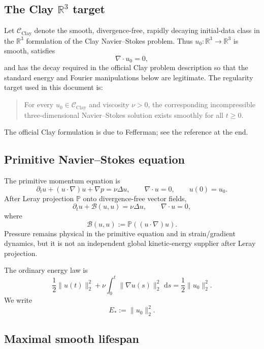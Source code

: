 \documentclass[11pt]{article}
\newcommand{\R}{\mathbb R}
\newcommand{\dd}{\,\mathrm d}
\begin{document}
\subsection{The Clay $\R^3$ target}

Let $\mathcal C_{\mathrm{Clay}}$ denote the smooth, divergence-free, rapidly decaying initial-data class in the $\R^3$ formulation of the Clay Navier--Stokes problem.  Thus $u_0:\R^3\to\R^3$ is smooth, satisfies
\[
\nabla\cdot u_0=0,
\]
and has the decay required in the official Clay problem description so that the standard energy and Fourier manipulations below are legitimate.  The regularity target used in this document is:

\begin{quote}
For every $u_0\in\mathcal C_{\mathrm{Clay}}$ and viscosity $\nu>0$, the corresponding incompressible three-dimensional Navier--Stokes solution exists smoothly for all $t\ge0$.
\end{quote}

The official Clay formulation is due to Fefferman; see the reference at the end.

\subsection{Primitive Navier--Stokes equation}

The primitive momentum equation is
\begin{equation}\label{eq:primitiveNS}
\partial_tu+(u\cdot\nabla)u+\nabla p=\nu\Delta u,
\qquad \nabla\cdot u=0,
\qquad u(0)=u_0.
\end{equation}
After Leray projection $\mathbb P$ onto divergence-free vector fields,
\begin{equation}\label{eq:LerayNS}
\boxed{
\partial_tu+\mathcal B(u,u)=\nu\Delta u,
\qquad \nabla\cdot u=0,
}
\end{equation}
where
\[
\mathcal B(u,u):=\mathbb P((u\cdot\nabla)u).
\]
Pressure remains physical in the primitive equation and in strain/gradient dynamics, but it is not an independent global kinetic-energy supplier after Leray projection.

The ordinary energy law is
\begin{equation}\label{eq:L2energy}
\frac12\|u(t)\|_2^2
+\nu\int_0^t\|\nabla u(s)\|_2^2\,\dd s
=\frac12\|u_0\|_2^2.
\end{equation}
We write
\[
E_*:=\|u_0\|_2^2.
\]

\subsection{Maximal smooth lifespan}
\end{document}
